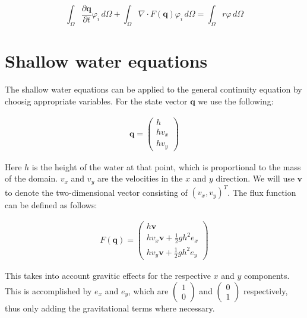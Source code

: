 \documentclass{article}
\newcommand{\pd}[2]{\dfrac{\partial #1}{\partial #2}}
\renewcommand{\phi}{\varphi}
\begin{document}
\begin{equation}
  \label{eq:general-continuity-equation-discontinuous-galerkin}
  \int_\Omega \pd{\mathbf{q}}{t} \phi_i \,d\Omega + \int_\Omega \nabla \cdot F(\mathbf{q}) \phi_i \,d\Omega = \int_\Omega r \phi \,d\Omega
\end{equation}

\section{Shallow water equations}
\label{sec:shallow-water-equations}

The shallow water equations can be applied to the general continuity equation by choosig appropriate variables. For the state vector $\mathbf{q}$ we use the following:

\begin{eqnarray*}
  \mathbf{q} =
  \begin{pmatrix}
    h \\ h v_x \\ h v_y
  \end{pmatrix}
\end{eqnarray*}

Here $h$ is the height of the water at that point, which is proportional to the mass of the domain. $v_x$ and $v_y$ are the velocities in the $x$ and $y$ direction. We will use $\mathbf{v}$ to denote the two-dimensional vector consisting of $\left( v_x, v_y \right)^T$. The flux function can be defined as follows:

\begin{eqnarray*}
  F(\mathbf{q}) =
  \begin{pmatrix}
    h \mathbf{v} \\ h v_x \mathbf{v} + \frac{1}{2} g h^2 e_x \\ h v_y \mathbf{v} + \frac{1}{2} g h^2 e_y
  \end{pmatrix}
\end{eqnarray*}

This takes into account gravitic effects for the respective $x$ and $y$ components. This is accomplished by $e_x$ and $e_y$, which are $\begin{pmatrix} 1 \\ 0 \end{pmatrix}$ and $\begin{pmatrix} 0 \\ 1 \end{pmatrix}$ respectively, thus only adding the gravitational terms where necessary.
\end{document}
